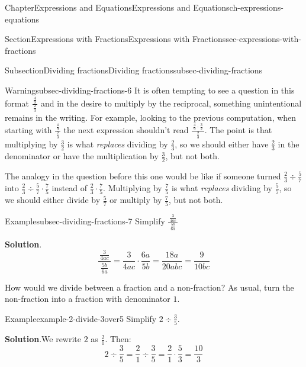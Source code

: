 \documentclass[twoside,11pt,]{book}
\newcommand{\blocktitlefont}{\relax}
\numberwithin{equation}{chapter}
\begin{document}
\begin{chapterptx}{Chapter}{Expressions and Equations}{}{Expressions and Equations}{}{}{ch-expressions-equations}
\begin{sectionptx}{Section}{Expressions with Fractions}{}{Expressions with Fractions}{}{}{sec-expressions-with-fractions}
\begin{subsectionptx}{Subsection}{Dividing fractions}{}{Dividing fractions}{}{}{subsec-dividing-fractions}
\begin{warning}{Warning}{}{subsec-dividing-fractions-6}
It is often tempting to see a question in this format \(\frac{\,\frac{4}{9}\,}{\,\frac{2}{3}\,}\) and in the desire to multiply by the reciprocal, something unintentional remains in the writing. For example, looking to the previous computation, when starting with \(\frac{\,\frac{4}{9}\,}{\,\frac{2}{3}\,}\) the next expression shouldn't read \(\frac{\,\frac{4}{9} \cdot \frac{3}{2} \,}{\,\frac{2}{3}\,}\). The point is that multiplying by \(\frac32\) is what \emph{replaces} dividing by \(\frac23\), so we should either have \(\frac23\) in the denominator or have the multiplication by \(\frac32\), but not both.%
\par
The analogy in the question before this one would be like if someone turned \(\frac{2}{3} \div \frac{5}{7}\) into \(\frac{2}{3} \div \frac{5}{7} \cdot \frac{7}{5}\) instead of \(\frac{2}{3} \cdot \frac{7}{5}\). Multiplying by \(\frac75\) is what \emph{replaces} dividing by \(\frac57\), so we should either divide by \(\frac57\) or multiply by \(\frac75\), but not both.%
\end{warning}
\begin{example}{Example}{}{subsec-dividing-fractions-7}%
Simplify \(\frac{\,\frac{3}{4ac}\,}{\,\frac{5b}{6a}\,}\)%
\par\smallskip%
\noindent\textbf{\blocktitlefont Solution}.\hypertarget{subsec-dividing-fractions-7-2}{}\quad{}%
\begin{equation*}
\frac{\,\frac{3}{4ac}\,}{\,\frac{5b}{6a}\,} = \frac{3}{4ac} \cdot \frac{6a}{5b} = \frac{18a}{20abc} = \frac{9}{10bc}
\end{equation*}
%
\end{example}
How would we divide between a fraction and a non-fraction? As usual, turn the non-fraction into a fraction with denominator \(1\).%
\begin{example}{Example}{}{example-2-divide-3over5}%
Simplify \(2 \div \frac{3}{5}\).%
\par\smallskip%
\noindent\textbf{\blocktitlefont Solution}.\hypertarget{example-2-divide-3over5-2}{}\quad{}We rewrite \(2\) as \(\frac{2}{1}\). Then:%
\begin{equation*}
2 \div \frac{3}{5} = \frac{2}{1} \div \frac{3}{5} = \frac{2}{1} \cdot \frac{5}{3} = \frac{10}{3}
\end{equation*}
%
\end{example}
\end{subsectionptx}
%
%
\typeout{************************************************}
\typeout{************************************************}

\end{sectionptx}
\end{chapterptx}
\end{document}
